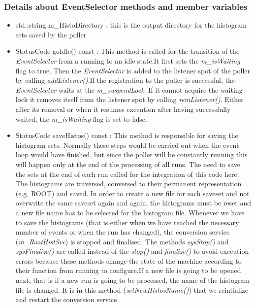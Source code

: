 \subsubsection{\textbf{Details about EventSelector methods and member variables}}
\begin{itemize}
\item std::string m\_HistoDirectory : this is the output directory for the histogram sets saved by the poller\par
\item StatusCode goIdle() const : This method is called for the transition of the \textit{EventSelector} from a running to an idle state.It first sets the \textit{m\_isWaiting} flag to true. Then the \textit{EventSelector} is added to the listener spot of the poller by calling \textit{addListener()}.If the registration to the poller is successful, the \textit{EventSelector} waits at the \textit{m\_suspendLock}. If it cannot acquire the waiting lock it removes itself from the listener spot by calling \textit{remListener()}. Either after its removal or when it resumes execution after having successfully waited, the \textit{m\_isWaiting} flag is set to false.\par

\item StatusCode saveHistos() const : This method is responsible for saving the histogram sets. Normally these steps would be carried out when the event loop would have finished, but since the poller will be constantly running this will happen only at the end of the processing of all runs. The need to save the sets at the end of each run called for the integration of this code here. The histograms are traversed, conversed to their permanent representation (e.g. ROOT) and saved. In order to create a new file for each saveset and not overwrite the same saveset again and again, the histograms must be reset and a new file name has to be selected for the histogram file. Whenever we have to save the histograms (that is either when we have reached the necessary number of events or when the run has changed), the conversion service (\textit{m\_RootHistSvc}) is stopped and finalised. The methods \textit{sysStop()} and \textit{sysFinalize()} are called instead of the  \textit{stop()} and \textit{finalize()} to avoid execution errors because these methods change the state of the machine according to their function from running to configure.If a new file is going to be opened next, that is if a new run is going to be processed, the name of the histogram file is changed. It is in this method (\textit{setNewHistosName()}) that we reintialize and restart the conversion service.


\end{itemize}


